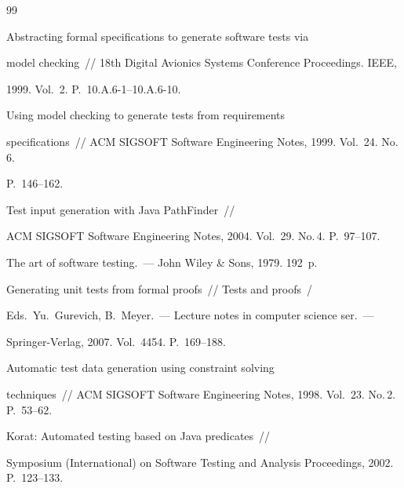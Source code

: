 {{\begin{thebibliography}{99}


 Abstracting formal specifications to generate software tests via


model checking~/\!\!/ 18th Digital Avionics Systems Conference Proceedings. IEEE,


1999. Vol.~2. P.~10.A.6-1--10.A.6-10.




 Using model checking to generate tests from requirements


specifications~/\!\!/ ACM SIGSOFT Software Engineering Notes, 1999. Vol.~24. No.\,6.


P.~146--162.




 Test input generation with Java PathFinder~/\!\!/


ACM SIGSOFT Software Engineering Notes, 2004. Vol.~29. No.\,4. P.~97--107.




 The art of software testing.~--- John Wiley \& Sons, 1979. 192~p.






Generating unit tests from formal proofs~/\!\!/ Tests and proofs~/


Eds.\ Yu.~Gurevich, B.~Meyer.~--- Lecture notes in computer science ser.~---


 Springer-Verlag, 2007. Vol.~4454. P.~169--188.







 Automatic test data generation using constraint solving


techniques~/\!\!/ ACM SIGSOFT Software Engineering Notes, 1998. Vol.~23. No.\,2. P.~53--62.







 Korat: Automated testing based on Java predicates~/\!\!/


Symposium (International) on Software Testing and Analysis Proceedings, 2002. P.~123--133.






\end{thebibliography}}}
